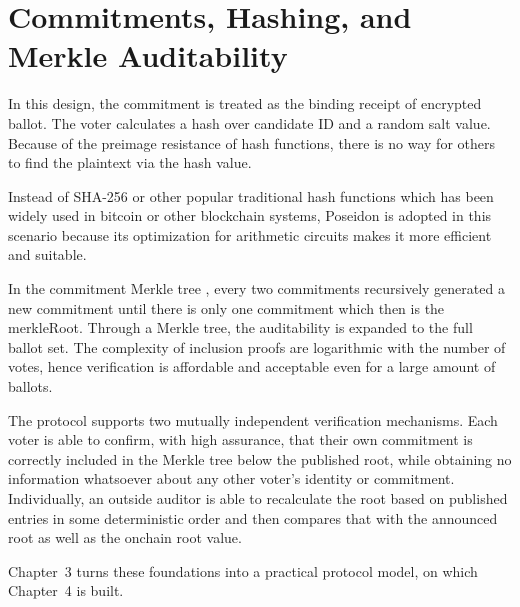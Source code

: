 \section{Commitments, Hashing, and Merkle Auditability}

In this design, the commitment is treated as the binding receipt of encrypted ballot. The voter calculates a hash over candidate ID and a random salt value. Because of the preimage resistance of hash functions, there is no way for others to find the plaintext via the hash value.

Instead of SHA-256 or other popular traditional hash functions which has been widely used in bitcoin or other blockchain systems, Poseidon \cite{poseidon2021} is adopted in this scenario because its optimization for arithmetic circuits makes it more efficient and suitable.

In the commitment Merkle tree \cite{merkle1988}, every two commitments recursively generated a new commitment until there is only one commitment which then is the merkleRoot. Through a Merkle tree, the auditability is expanded to the full ballot set. The complexity of inclusion proofs are logarithmic with the number of votes, hence verification is affordable and acceptable even for a large amount of ballots.

The protocol supports two mutually independent verification mechanisms. Each voter is able to confirm, with high assurance, that their own commitment is correctly included in the Merkle tree below the published root, while obtaining no information whatsoever about any other voter's identity or commitment. Individually, an outside auditor is able to recalculate the root based on published entries in some deterministic order and then compares that with the announced root as well as the onchain root value.

Chapter~3 turns these foundations into a practical protocol model, on which Chapter~4 is built.

\endgroup
